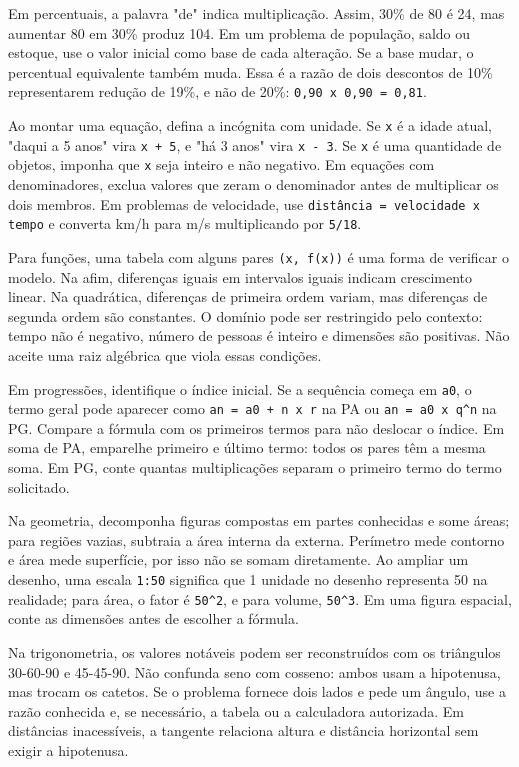 \documentclass[11pt,a4paper]{article}
\begin{document}
Em percentuais, a palavra "de" indica multiplicação. Assim, 30\% de 80 é 24, mas aumentar 80 em 30\% produz 104. Em um problema de população, saldo ou estoque, use o valor inicial como base de cada alteração. Se a base mudar, o percentual equivalente também muda. Essa é a razão de dois descontos de 10\% representarem redução de 19\%, e não de 20\%: \texttt{0,90 x 0,90 = 0,81}.

Ao montar uma equação, defina a incógnita com unidade. Se \texttt{x} é a idade atual, "daqui a 5 anos" vira \texttt{x + 5}, e "há 3 anos" vira \texttt{x - 3}. Se \texttt{x} é uma quantidade de objetos, imponha que \texttt{x} seja inteiro e não negativo. Em equações com denominadores, exclua valores que zeram o denominador antes de multiplicar os dois membros. Em problemas de velocidade, use \texttt{distância = velocidade x tempo} e converta km/h para m/s multiplicando por \texttt{5/18}.

Para funções, uma tabela com alguns pares \texttt{(x, f(x))} é uma forma de verificar o modelo. Na afim, diferenças iguais em intervalos iguais indicam crescimento linear. Na quadrática, diferenças de primeira ordem variam, mas diferenças de segunda ordem são constantes. O domínio pode ser restringido pelo contexto: tempo não é negativo, número de pessoas é inteiro e dimensões são positivas. Não aceite uma raiz algébrica que viola essas condições.

Em progressões, identifique o índice inicial. Se a sequência começa em \texttt{a0}, o termo geral pode aparecer como \texttt{an = a0 + n x r} na PA ou \texttt{an = a0 x q\textasciicircum{}n} na PG. Compare a fórmula com os primeiros termos para não deslocar o índice. Em soma de PA, emparelhe primeiro e último termo: todos os pares têm a mesma soma. Em PG, conte quantas multiplicações separam o primeiro termo do termo solicitado.

Na geometria, decomponha figuras compostas em partes conhecidas e some áreas; para regiões vazias, subtraia a área interna da externa. Perímetro mede contorno e área mede superfície, por isso não se somam diretamente. Ao ampliar um desenho, uma escala \texttt{1:50} significa que 1 unidade no desenho representa 50 na realidade; para área, o fator é \texttt{50\textasciicircum{}2}, e para volume, \texttt{50\textasciicircum{}3}. Em uma figura espacial, conte as dimensões antes de escolher a fórmula.

Na trigonometria, os valores notáveis podem ser reconstruídos com os triângulos 30-60-90 e 45-45-90. Não confunda seno com cosseno: ambos usam a hipotenusa, mas trocam os catetos. Se o problema fornece dois lados e pede um ângulo, use a razão conhecida e, se necessário, a tabela ou a calculadora autorizada. Em distâncias inacessíveis, a tangente relaciona altura e distância horizontal sem exigir a hipotenusa.
\end{document}
